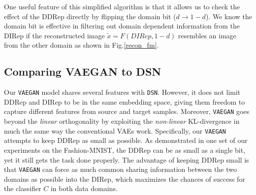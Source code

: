 \documentclass{article}
\newcommand\todo[1]{\textcolor{red}{#1}}
\begin{document}
One useful feature of this simplified algorithm is that it allows us to check the effect of the DDRep directly by flipping the domain bit ($d\rightarrow 1-d$). We know the domain bit is effective in filtering out domain dependent information from the DIRep if the reconstructed image $\tilde{x} = F(DIRep, 1-d)$  resembles an image from the other domain as shown in Fig.\ref{recon_fm}. 

\subsection{Comparing VAEGAN to DSN}Our \verb"VAEGAN" model shares several features with \verb"DSN". However, it does not limit DDRep and DIRep to be in the same embedding space, giving them freedom to capture different features from source and target samples. Moreover, \verb"VAEGAN" goes beyond the \textit{linear} orthogonality by exploiting the \textit{non-linear} KL-divergence in much the same way the conventional VAEs work. Specifically, our \verb"VAEGAN" attempts to keep DDRep as small as possible. As demonstrated in one set of our experiments on the Fashion-MNIST, the DDRep can be as small as a single bit, yet it still gets the task done properly. The advantage of keeping DDRep small is that \verb"VAEGAN" can force as much common sharing information between the two domains as possible into the DIRep, which maximizes the chances of success for the classifier $C$ in both data domains. 
\end{document}

